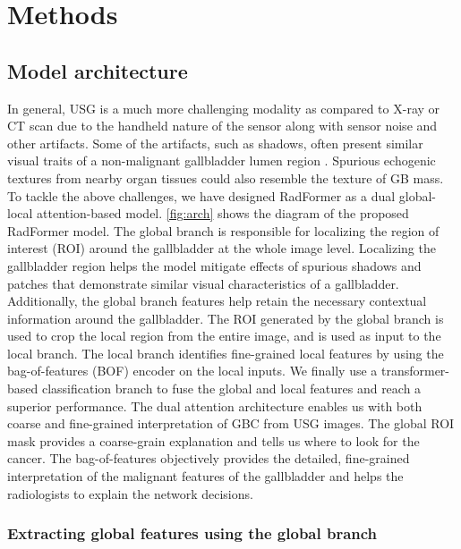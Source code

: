 \documentclass[twocolumn,final]{elsarticle}
\def\myarch{RadFormer\xspace}
\begin{document}
\section{Methods}

\subsection{Model architecture}

In general, USG is a much more challenging modality as compared to X-ray or CT scan due to the handheld nature of the sensor along with sensor noise and other artifacts. Some of the artifacts, such as shadows, often present similar visual traits of a non-malignant gallbladder lumen region \citep{basu2022surpassing}. Spurious echogenic textures from nearby organ tissues could also resemble the texture of GB mass. To tackle the above challenges, we have designed \myarch as a dual global-local attention-based model. \cref{fig:arch} shows the diagram of the proposed \myarch model. The global branch is responsible for localizing the region of interest (ROI) around the gallbladder at the whole image level. Localizing the gallbladder region helps the model mitigate effects of spurious shadows and patches that demonstrate similar visual characteristics of a gallbladder. Additionally, the global branch features help retain the necessary contextual information around the gallbladder. The ROI generated by the global branch is used to crop the local region from the entire image, and is used as input to the local branch. The local branch identifies fine-grained local features by using the bag-of-features (BOF) encoder on the local inputs. We finally use a transformer-based classification branch to fuse the global and local features and reach a superior performance. The dual attention architecture enables us with both coarse and fine-grained interpretation of GBC from USG images. The global ROI mask provides a coarse-grain explanation and tells us where to look for the cancer. The bag-of-features objectively provides the detailed, fine-grained interpretation of the malignant features of the gallbladder and helps the radiologists to explain the network decisions.

\subsubsection{Extracting global features using the global branch}
\end{document}

